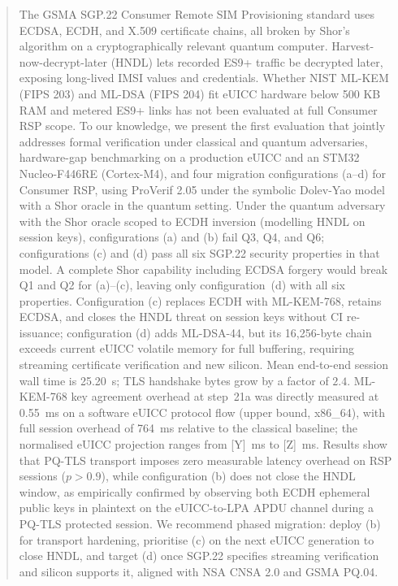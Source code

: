 \documentclass[a4paper,fleqn]{cas-sc}
\begin{document}
\begin{abstract}
The GSMA SGP.22 Consumer Remote SIM Provisioning standard uses ECDSA,
ECDH, and X.509 certificate chains, all broken by Shor's algorithm on a
cryptographically relevant quantum computer. Harvest-now-decrypt-later
(HNDL) lets recorded ES9+ traffic be decrypted later, exposing long-lived
IMSI values and credentials. Whether NIST ML-KEM (FIPS 203) and ML-DSA
(FIPS 204) fit eUICC hardware below 500 KB RAM and metered ES9+ links has
not been evaluated at full Consumer RSP scope. To our knowledge, we
present the first evaluation that jointly addresses formal verification
under classical and quantum adversaries, hardware-gap benchmarking on a
production eUICC and an STM32 Nucleo-F446RE (Cortex-M4), and four
migration configurations (a--d) for Consumer RSP, using ProVerif 2.05 under
the symbolic Dolev-Yao model with a Shor oracle in the quantum setting.
Under the quantum adversary with the Shor oracle scoped to ECDH inversion
(modelling HNDL on session keys), configurations (a) and (b) fail Q3, Q4, and
Q6; configurations (c) and (d) pass all six SGP.22 security properties in
that model. A complete Shor capability including ECDSA forgery would break
Q1 and Q2 for (a)--(c), leaving only configuration~(d) with all six properties. Configuration (c) replaces ECDH with ML-KEM-768,
retains ECDSA, and closes the HNDL threat on session keys without CI
re-issuance; configuration (d) adds ML-DSA-44, but its 16,256-byte chain
exceeds current eUICC volatile memory for full buffering, requiring
streaming certificate verification and new silicon. Mean end-to-end
session wall time is 25.20~s; TLS handshake bytes grow by a factor of
$2.4$. ML-KEM-768 key agreement overhead at step~21a was directly measured
at 0.55~ms on a software eUICC protocol flow (upper bound, x86\_64), with
full session overhead of 764~ms relative to the classical baseline; the
normalised eUICC projection ranges from [Y]~ms to [Z]~ms. Results show that
PQ-TLS transport imposes zero measurable latency overhead on RSP sessions
($p > 0.9$), while configuration (b) does not close the HNDL window, as empirically
confirmed by observing both ECDH ephemeral public keys
in plaintext on the eUICC-to-LPA APDU channel during a PQ-TLS protected
session. We recommend phased migration:
deploy (b) for transport hardening, prioritise (c) on the next eUICC
generation to close HNDL, and target (d) once SGP.22 specifies streaming
verification and silicon supports it, aligned with NSA CNSA 2.0 and GSMA
PQ.04.
\end{abstract}
\end{document}
